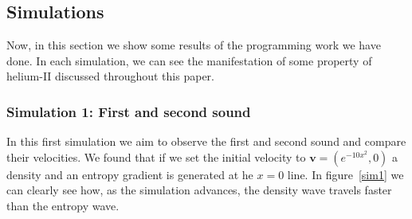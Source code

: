 \documentclass{article}
\begin{document}
\subsection{Simulations}

Now, in this section we show some results of the programming work we have done. In each simulation, we can see the manifestation of some property of helium-II discussed throughout this paper.

\subsubsection{Simulation 1: First and second sound}
In this first simulation we aim to observe the first and second sound and compare their velocities.
We found that if we set the initial velocity to \(\mathbf{v} = (e^{-10x^2}, 0)\) a density and an entropy gradient is generated at he \(x=0\) line. 
In figure~\ref{sim1} we can clearly see how, as the simulation advances, the density wave travels faster than the entropy wave.
\end{document}

